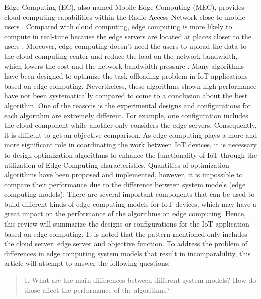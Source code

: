 \documentclass[a4paper,11pt]{article}
\begin{document}
Edge Computing (EC), also named Mobile Edge Computing (MEC), provides cloud computing capabilities within the Radio Access Network close to mobile users \cite{EC_definition}. Compared with cloud computing, edge computing is more likely to compute in real-time because the edge servers are located at places closer to the users \cite{edge_advantage_archetecture}. Moreover, edge computing doesn't need the users to upload the data to the cloud computing center and reduce the load on the network bandwidth, which lowers the cost and the network bandwidth pressure \cite{edge_advantage_archetecture}. Many algorithms have been designed to optimize the task offloading problem in IoT applications based on edge computing. Nevertheless, these algorithms shown high performance have not been systematically compared to come to a conclusion about the best algorithm. One of the reasons is the experimental designs and configurations for each algorithm are extremely different. For example, one configuration includes the cloud component while another only considers the edge servers. Consequently, it is difficult to get an objective comparison. \newline\newline
As edge computing plays a more and more significant role in coordinating the work between IoT devices, it is necessary to design optimization algorithms to enhance the functionality of IoT through the utilization of Edge Computing characteristics. Quantities of optimization algorithms have been proposed and implemented, however, it is impossible to compare their performance due to the difference between system models (edge computing models). There are several important components that can be used to build different kinds of edge computing models for IoT devices, which may have a great impact on the performance of the algorithms on edge computing. Hence, this review will summarize the designs or configurations for the IoT application based on edge computing. It is noted that the pattern mentioned only includes the cloud server, edge server and objective function.\newline\newline
To address the problem of differences in edge computing system models that result in incomparability, this article will attempt to answer the following questions:
        \begin{quote}
                1. What are the main differences between different system models? How do those affect the performance of the algorithms?
        \end{quote}
\end{document}
